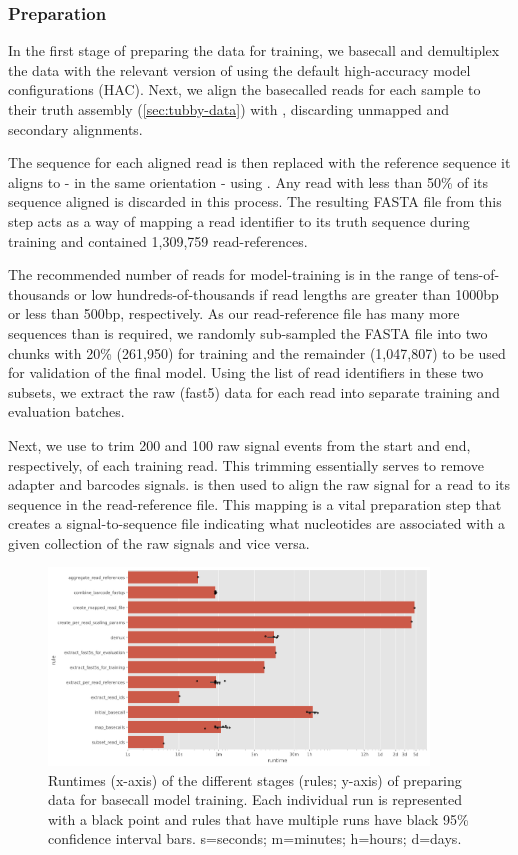 \subsubsection{Preparation}

In the first stage of preparing the data for training, we basecall and demultiplex the data with the relevant version of \guppy{} using the default high-accuracy model configurations (HAC). Next, we align the basecalled reads for each sample to their truth assembly (\autoref{sec:tubby-data}) with  \cite{li2018}, discarding unmapped and secondary alignments.

The sequence for each aligned read is then replaced with the reference sequence it aligns to - in the same orientation - using \taiyaki{}. Any read with less than 50\%  of its sequence aligned is discarded in this process. The resulting FASTA file from this step acts as a way of mapping a read identifier to its truth sequence during training and contained 1,309,759 read-references.

The recommended number of reads for \taiyaki{} model-training is in the range of tens-of-thousands or low hundreds-of-thousands if read lengths are greater than 1000bp or less than 500bp, respectively. As our read-reference file has many more sequences than is required, we randomly sub-sampled the FASTA file into two chunks with 20\% (261,950) for training and the remainder (1,047,807) to be used for validation of the final model. Using the list of read identifiers in these two subsets, we extract the raw (fast5) data for each read into separate training and evaluation batches. 

Next, we use \taiyaki{} to trim 200 and 100 raw signal events from the start and end, respectively, of each training read. This trimming essentially serves to remove adapter and barcodes signals. \taiyaki{} is then used to align the raw signal for a read to its sequence in the read-reference file. This mapping is a vital preparation step that creates a signal-to-sequence file indicating what nucleotides are associated with a given collection of the raw signals and vice versa.

\begin{figure}
\includegraphics[width=0.9\textwidth]{Chapter4/Figs/prep_runtime.png}
\centering
\caption{Runtimes (x-axis) of the different stages (rules; y-axis) of preparing data for basecall model training. Each individual run is represented with a black point and rules that have multiple runs have black 95\% confidence interval bars. s=seconds; m=minutes; h=hours; d=days.}
\label{fig:prep_runtime}
\end{figure}

